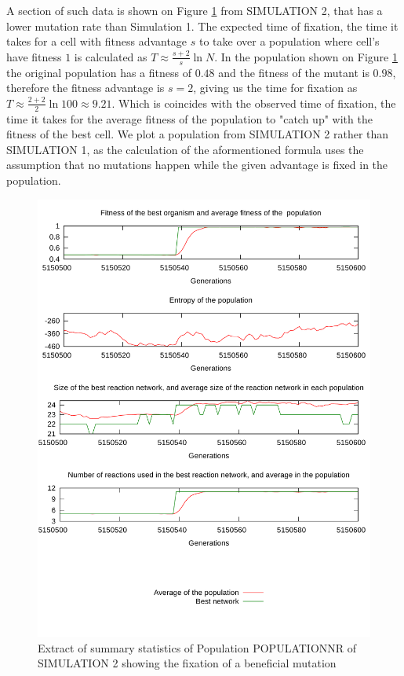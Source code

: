 \documentclass[10pt,a4paper]{article}
\begin{document}
A section of such data is shown on Figure \ref{fig:fixation} from SIMULATION 2, that has a lower mutation rate than Simulation 1. The expected time of fixation, the time it takes for a cell with fitness advantage $s$ to take over a population where cell's have fitness $1$ is calculated as $T \approx \frac{s+2}{s}\ln N$. In the population shown on Figure \ref{fig:fixation} the original population has a fitness of $0.48$ and the fitness of the mutant is $0.98$, therefore the fitness advantage is $s=2$, giving us the time for fixation as $T\approx \frac{2+2}{2}\ln 100 \approx 9.21$. Which is coincides with the observed time of fixation, the time it takes for the average fitness of the population to "catch up" with the fitness of the best cell. We plot a population from SIMULATION 2 rather than SIMULATION 1, as the calculation of the aformentioned formula uses the assumption that no mutations happen while the given advantage is fixed in the population. 

\begin{figure}[htpb]
	\centering
	\includegraphics[width=0.8\linewidth]{fixation.pdf}
	\caption{Extract of summary statistics of Population POPULATIONNR of SIMULATION 2 showing the fixation of a beneficial mutation}
	\label{fig:fixation}
\end{figure}
\end{document}
